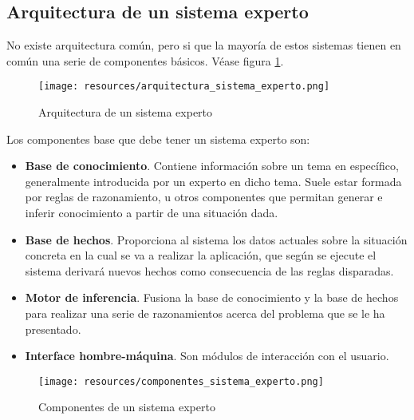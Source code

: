 \documentclass[a4paper, 11pt, titlepage]{article}
\begin{document}
    \subsection{Arquitectura de un sistema experto}

        No existe arquitectura común, pero si que la mayoría de estos sistemas tienen en común 
        una serie de componentes básicos. Véase figura \ref{arquitectura_sistema_experto}.

        \begin{figure}[htp]
            \centering
            \texttt{[image: resources/arquitectura\_sistema\_experto.png]}
            \caption{Arquitectura de un sistema experto}
            \label{arquitectura_sistema_experto}
        \end{figure}    

        Los componentes base que debe tener un sistema experto son:

        \begin{itemize}
            \item \textbf{Base de conocimiento}. Contiene información sobre un tema en específico, 
            generalmente introducida por un experto en dicho tema. Suele estar formada por reglas de 
            razonamiento, u otros componentes que permitan generar e inferir conocimiento a partir de 
            una situación dada.
            \item \textbf{Base de hechos}. Proporciona al sistema los datos actuales sobre la situación 
            concreta en la cual se va a realizar la aplicación, que según se ejecute el sistema derivará 
            nuevos hechos como consecuencia de las reglas disparadas.
            \item \textbf{Motor de inferencia}. Fusiona la base de conocimiento y la base de hechos para 
            realizar una serie de razonamientos acerca del problema que se le ha presentado.
            \item \textbf{Interface hombre-máquina}. Son módulos de interacción con el usuario.
        \end{itemize}

        \begin{figure}[htp]
            \centering
            \texttt{[image: resources/componentes\_sistema\_experto.png]}
            \caption{Componentes de un sistema experto}
            \label{componentes_sistema_experto}
        \end{figure}    
\end{document}
